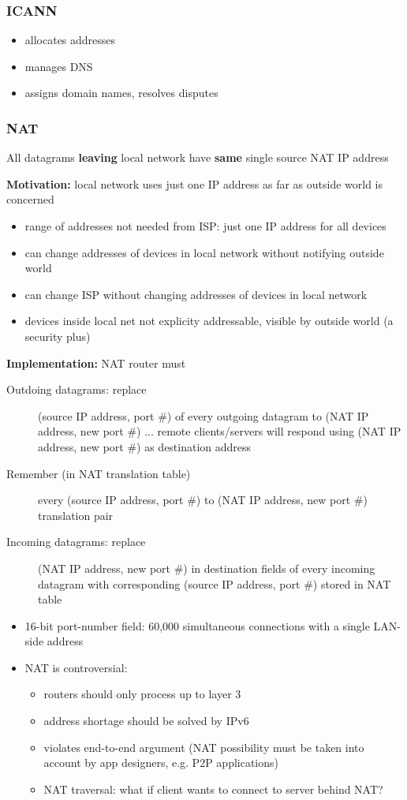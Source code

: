 \subsubsection{ICANN}
\begin{itemize}
	\item allocates addresses
	\item manages DNS
	\item assigns domain names, resolves disputes
\end{itemize}
\subsubsection{NAT}
All datagrams \textbf{leaving} local network have \textbf{same} single source NAT IP address
\begin{leftbar}
	\textbf{Motivation:} local network uses just one IP address as far as outside world is concerned
\end{leftbar}
\begin{itemize}
	\item range of addresses not needed from ISP: just one IP address for all devices
	\item can change addresses of devices in local network without notifying outside world
	\item can change ISP without changing addresses of devices in local network
	\item devices inside local net not explicity addressable, visible by outside world (a security plus)
\end{itemize}
\textbf{Implementation:} NAT router must
\begin{description}
	\item[Outdoing datagrams: replace] (source IP address, port \#) of every outgoing datagram to (NAT IP address, new port \#) ... remote clients/servers will respond using (NAT IP address, new port \#) as destination address
	\item[Remember (in NAT translation table)] every (source IP address, port \#) to (NAT IP address, new port \#) translation pair
	\item[Incoming datagrams: replace] (NAT IP address, new port \#) in destination fields of every incoming datagram with corresponding (source IP address, port \#) stored in NAT table
\end{description}
\begin{itemize}
	\item 16-bit port-number field: 60,000 simultaneous connections with a single LAN-side address
	\item NAT is controversial:
	\begin{itemize}
		\item routers should only process up to layer 3
		\item address shortage should be solved by IPv6
		\item violates end-to-end argument (NAT possibility must be taken into account by app designers, e.g. P2P applications)
		\item NAT traversal: what if client wants to connect to server behind NAT?
	\end{itemize}
\end{itemize}
